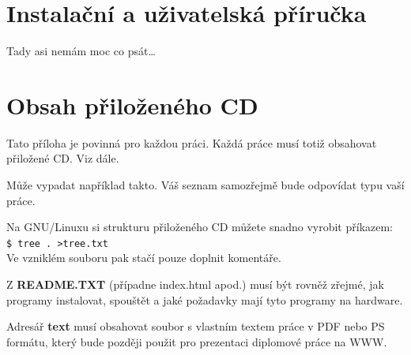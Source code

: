\documentclass[11pt,twoside,a4paper]{book}
\begin{document}
\chapter{Instalační a uživatelská příručka}
Tady asi nemám moc co psát\ldots


\chapter{Obsah přiloženého CD}
\label{chap:CD}
Tato příloha je povinná pro každou práci. Každá práce musí totiž obsahovat přiložené CD. Viz dále.

Může vypadat například takto. Váš seznam samozřejmě bude odpovídat typu vaší práce.


Na GNU/Linuxu si strukturu přiloženého CD můžete snadno vyrobit příkazem:\\ 
\verb|$ tree . >tree.txt|\\
Ve vzniklém souboru pak stačí pouze doplnit komentáře.

Z \textbf{README.TXT} (případne index.html apod.)  musí být rovněž zřejmé, jak programy instalovat, spouštět a
jaké požadavky mají tyto programy na hardware.

Adresář \textbf{text}  musí obsahovat soubor s vlastním textem práce v PDF nebo PS formátu, který bude později
použit pro prezentaci diplomové práce na WWW.
\end{document}
